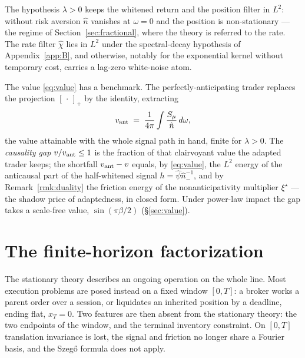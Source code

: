 \documentclass[11pt]{article}
\newcommand{\pluspart}[1]{\left[#1\right]_+}
\theoremstyle{plain}
\theoremstyle{definition}
\theoremstyle{remark}
\begin{document}
The hypothesis $\lambda>0$ keeps the whitened return and the position filter in $L^2$: without risk aversion $\hat n$ vanishes at $\omega=0$ and the position is non-stationary --- the regime of Section~\ref{sec:fractional}, where the theory is referred to the rate. The rate filter $\hat\chi$ lies in $L^2$ under the spectral-decay hypothesis of Appendix~\ref{app:B}, and otherwise, notably for the exponential kernel without temporary cost, carries a lag-zero white-noise atom.

The value \eqref{eq:value} has a benchmark. The perfectly-anticipating trader replaces the projection $\pluspart{\,\cdot\,}$ by the identity, extracting
\begin{equation}\label{eq:vant}
v_{\rm ant} \;=\; \frac{1}{4\pi}\int \frac{S_\mu}{\hat n}\,d\omega,
\end{equation}
the value attainable with the whole signal path in hand, finite for $\lambda>0$. The \emph{causality gap} $v/v_{\rm ant}\le1$ is the fraction of that clairvoyant value the adapted trader keeps; the shortfall $v_{\rm ant}-v$ equals, by \eqref{eq:value}, the $L^2$ energy of the anticausal part of the half-whitened signal $h=\hat\psi\hat n_-^{-1}$, and by Remark~\ref{rmk:duality} the friction energy of the nonanticipativity multiplier $\xi^\star$ --- the shadow price of adaptedness, in closed form. Under power-law impact the gap takes a scale-free value, $\sin(\pi\beta/2)$ (\S\ref{sec:value}).

\section{The finite-horizon factorization}\label{sec:boundary}

The stationary theory describes an ongoing operation on the whole line. Most execution problems are posed instead on a fixed window $[0,T]$: a broker works a parent order over a session, or liquidates an inherited position by a deadline, ending flat, $x_T=0$. Two features are then absent from the stationary theory: the two endpoints of the window, and the terminal inventory constraint. On $[0,T]$ translation invariance is lost, the signal and friction no longer share a Fourier basis, and the Szeg\H{o} formula does not apply.
\end{document}

